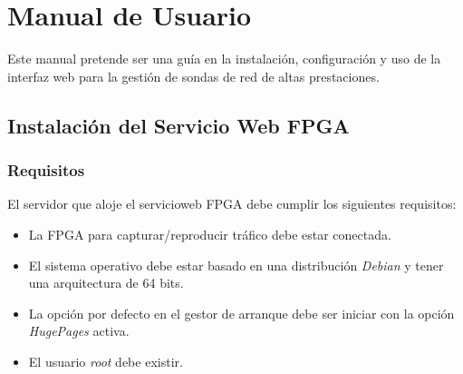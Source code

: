 \chapter{Manual de Usuario\label{extra:manual_de_usuario}}

Este manual pretende ser una guía en la instalación, configuración y uso de la interfaz web para la gestión de sondas de red de altas prestaciones.

\section{Instalación del Servicio Web FPGA\label{extra:manual:instalacionfpga}}

\subsection*{Requisitos}
El servidor que aloje el \gls{servicioweb} \gls{FPGA} debe cumplir los siguientes requisitos:
\begin{itemize}
  \item La \gls{FPGA} para capturar/reproducir tráfico debe estar conectada.
  \item El sistema operativo debe estar basado en una distribución \textit{Debian} \cite{debian} y tener una arquitectura de 64 bits.
  \item La opción por defecto en el gestor de arranque debe ser iniciar con la opción \textit{HugePages} activa.
  \item El usuario \textit{root} debe existir.
\end{itemize}

